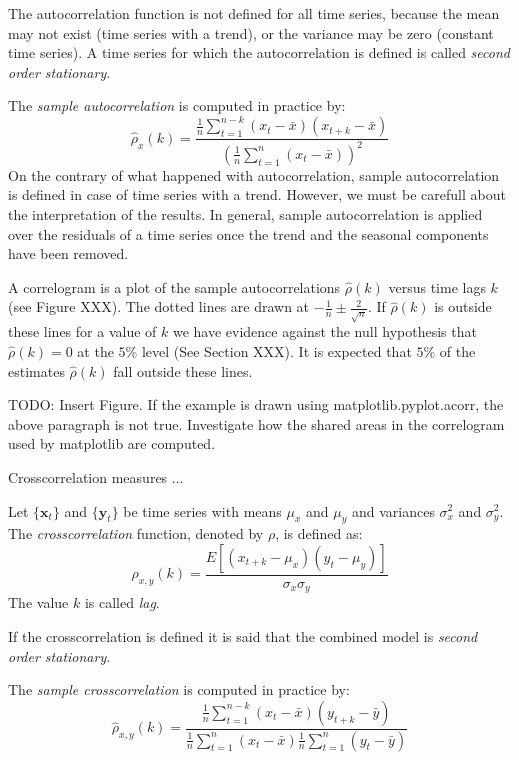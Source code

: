The autocorrelation function is not defined for all time series, because the mean may not exist (time series with a trend), or the variance may be zero (constant time series). A time series for which the autocorrelation is defined is called \emph{second order stationary}.

The \emph{sample autocorrelation} is computed in practice by:
\[
\hat{\rho}_x(k) = \frac{ \frac{1}{n}\sum_{t=1}^{n-k}\left(x_{t}-\bar{x}\right)\left(x_{t+k}-\bar{x}\right) }{ \left( \frac{1}{n}\sum_{t=1}^{n}\left(x_{t}-\bar{x}\right) \right)^2 }
\]
On the contrary of what happened with autocorrelation, sample autocorrelation is defined in case of time series with a trend. However, we must be carefull about the interpretation of the results. In general, sample autocorrelation is applied over the residuals of a time series once the trend and the seasonal components have been removed.

A correlogram is a plot of the sample autocorrelations $\hat{\rho}(k)$ versus time lags $k$ (see Figure {\color{red} XXX}). The dotted lines are drawn at $-\frac{1}{n}\pm\frac{2}{\sqrt{n}}$. If $\hat{\rho}(k)$ is outside these lines for a value of $k$ we have evidence against the null hypothesis that $\hat{\rho}(k)=0$ at the $5\%$ level (See Section {\color{red} XXX}). It is expected that $5\%$ of the estimates $\hat{\rho}(k)$ fall outside these lines.

\begin{example}
{\color {red} TODO: Insert Figure. If the example is drawn using matplotlib.pyplot.acorr, the above paragraph is not true. Investigate how the shared areas in the correlogram used by matplotlib are computed.}
\end{example}

Crosscorrelation measures ...

\begin{definition}
Let $\{\mathbf{x}_t\}$ and $\{\mathbf{y}_t\}$ be time series with means $\mu_x$ and $\mu_y$ and variances $\sigma_x^2$ and $\sigma_y^2$. The \emph{crosscorrelation} function, denoted by $\rho$, is defined as:
\[
\rho_{x,y}(k) = \frac{E\left[\left(x_{t+k}-\mu_x\right)\left(y_t-\mu_y\right)\right]}{\sigma_x \sigma_y}
\]
The value $k$ is called \emph{lag}.
\end{definition}

If the crosscorrelation is defined it is said that the combined model is \emph{second order stationary}.

The \emph{sample crosscorrelation} is computed in practice by:
\[
\hat{\rho}_{x,y}(k) = \frac{ \frac{1}{n}\sum_{t=1}^{n-k}\left(x_{t}-\bar{x}\right)\left(y_{t+k}-\bar{y}\right) }{ \frac{1}{n}\sum_{t=1}^{n}\left(x_{t}-\bar{x}\right) \frac{1}{n}\sum_{t=1}^{n}\left(y_{t}-\bar{y}\right) }
\]

